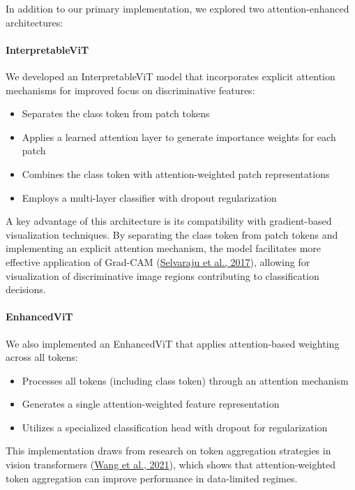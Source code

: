 \documentclass[a4paper,12pt]{report}
\begin{document}
In addition to our primary implementation, we explored two attention-enhanced architectures:

\paragraph{InterpretableViT}
We developed an InterpretableViT model that incorporates explicit attention mechanisms for improved focus on discriminative features:

\begin{itemize}
    \item Separates the class token from patch tokens
    \item Applies a learned attention layer to generate importance weights for each patch
    \item Combines the class token with attention-weighted patch representations
    \item Employs a multi-layer classifier with dropout regularization
\end{itemize}

A key advantage of this architecture is its compatibility with gradient-based visualization techniques. By separating the class token from patch tokens and implementing an explicit attention mechanism, the model facilitates more effective application of Grad-CAM (\href{https://arxiv.org/abs/1610.02391}{Selvaraju et al., 2017}), allowing for visualization of discriminative image regions contributing to classification decisions.

\paragraph{EnhancedViT}
We also implemented an EnhancedViT that applies attention-based weighting across all tokens:

\begin{itemize}
    \item Processes all tokens (including class token) through an attention mechanism
    \item Generates a single attention-weighted feature representation
    \item Utilizes a specialized classification head with dropout for regularization
\end{itemize}

This implementation draws from research on token aggregation strategies in vision transformers (\href{https://arxiv.org/abs/2012.09688}{Wang et al., 2021}), which shows that attention-weighted token aggregation can improve performance in data-limited regimes.
\end{document}
